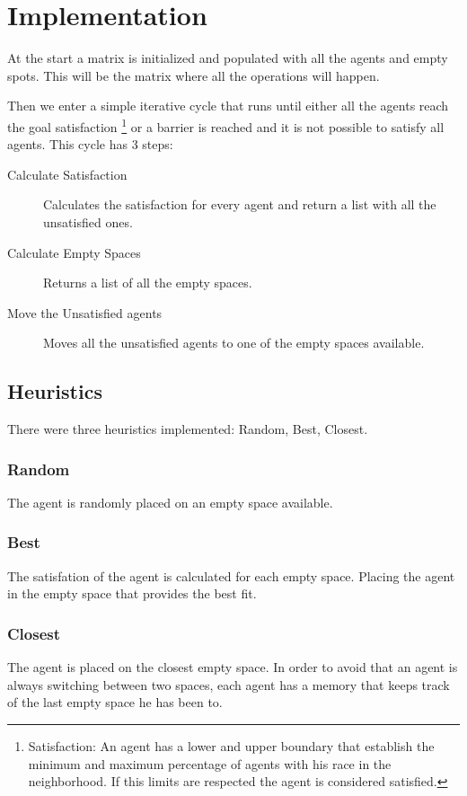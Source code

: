 \documentclass[a4paper,titlepage,11pt]{article}
\begin{document}
\newpage

\section{Implementation}
At the start a matrix is initialized and populated with all the agents and empty spots.
This will be the matrix where all the operations will happen.

Then we enter a simple iterative cycle that runs until either all the agents reach the goal satisfaction
\footnote{Satisfaction: An agent has a lower and upper boundary that establish the minimum and maximum
percentage of agents with his race in the neighborhood. If this limits are respected the agent is considered
satisfied.}
or a barrier is reached and it is not possible to satisfy all agents. 
This cycle has 3 steps:

\begin{description}
\item [ Calculate Satisfaction ] Calculates the satisfaction for every agent and return a list with all the unsatisfied ones.
\item [ Calculate Empty Spaces ] Returns a list of all the empty spaces.
\item [ Move the Unsatisfied agents ] Moves all the unsatisfied agents to one of the empty spaces available.
\end{description}

\subsection{Heuristics}
There were three heuristics implemented: Random, Best, Closest.

\subsubsection{Random}
The agent is randomly placed on an empty space available.

\subsubsection{Best}
The satisfation of the agent is calculated for each empty space.
Placing the agent in the empty space that provides the best fit.

\subsubsection{Closest}
The agent is placed on the closest empty space.
In order to avoid that an agent is always switching between two spaces,
each agent has a memory that keeps track of the last empty space he has been to.
\end{document}
